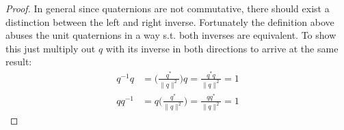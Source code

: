 \documentclass[12pt, letterpaper, onecolumn, conference, final]{IEEEtran}
\theoremstyle{definition}
\newtheorem{proposition}{Proposition}
\theoremstyle{plain}
\begin{document}
\begin{center}
\end{center}

\begin{proof}
In general since quaternions are not commutative, there should exist a distinction between the left and right inverse. Fortunately the definition above abuses the unit quaternions in a way s.t. both inverses are equivalent. To show this just multiply out $q$ with its inverse in both directions to arrive at the same result:
\begin{equation*}
\begin{split}
q^{-1}q &= \Big( \frac{q^*}{\| q \|^2} \Big) q = \frac{q^*q}{\| q \|^2} = 1 \\
qq^{-1} &= q \Big( \frac{q^*}{\| q \|^2} \Big) = \frac{qq^*}{\| q \|^2} = 1
\end{split}
\end{equation*}
\end{proof}

\begin{center}
\end{center}
\end{document}
